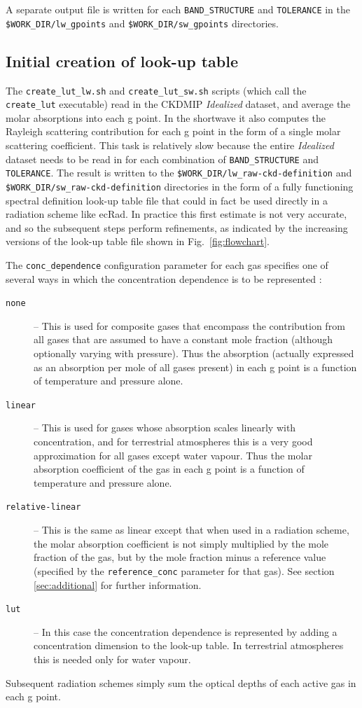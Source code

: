 \documentclass[a4,oneside]{article}
\def\codesize{\small}
\def\codesize{\small}
\def\code#1{{\codesize\texttt{#1}}}
\begin{document}
A separate output file is written for each \code{BAND\_STRUCTURE} and
\code{TOLERANCE} in the \code{\$WORK\_DIR/lw\_gpoints} and
\code{\$WORK\_DIR/sw\_gpoints} directories.

\subsection{Initial creation of look-up table}
\label{sec:create_lut}
The \code{create\_lut\_lw.sh} and \code{create\_lut\_sw.sh} scripts
(which call the \code{create\_lut} executable) read in the CKDMIP
\emph{Idealized} dataset, and average the molar absorptions into each
g point. In the shortwave it also computes the Rayleigh scattering
contribution for each g point in the form of a single molar scattering
coefficient. This task is relatively slow because the entire
\emph{Idealized} dataset needs to be read in for each combination of
\code{BAND\_STRUCTURE} and \code{TOLERANCE}. The result is written to
the \code{\$WORK\_DIR/lw\_raw-ckd-definition} and
\code{\$WORK\_DIR/sw\_raw-ckd-definition} directories in the form of a
fully functioning spectral definition look-up table file that could in
fact be used directly in a radiation scheme like ecRad. In practice
this first estimate is not very accurate, and so the subsequent steps
perform refinements, as indicated by the increasing versions of the
look-up table file shown in Fig.\ \ref{fig:flowchart}.

The \code{conc\_dependence} configuration parameter for each gas
specifies one of several ways in which the concentration dependence is
to be represented \cite[see][for the mathematical
  definition]{Hogan&2022}:
\begin{description}
\item[\code{none}] -- This is used for composite gases that encompass
  the contribution from all gases that are assumed to have a constant
  mole fraction (although optionally varying with pressure). Thus the
  absorption (actually expressed as an absorption per mole of all
  gases present) in each g point is a function of temperature and
  pressure alone.
\item[\code{linear}] -- This is used for gases whose absorption scales
  linearly with concentration, and for terrestrial atmospheres this is
  a very good approximation for all gases except water vapour. Thus
  the molar absorption coefficient of the gas in each g point is a
  function of temperature and pressure alone.
\item[\code{relative-linear}] -- This is the same as linear except
  that when used in a radiation scheme, the molar absorption
  coefficient is not simply multiplied by the mole fraction of the
  gas, but by the mole fraction minus a reference value (specified by
  the \code{reference\_conc} parameter for that gas). See section
  \ref{sec:additional} for further information.
\item[\code{lut}] -- In this case the concentration dependence is
  represented by adding a concentration dimension to the look-up
  table. In terrestrial atmospheres this is needed only for water
  vapour.
\end{description}
Subsequent radiation schemes simply sum the optical depths of each
active gas in each g point.
\end{document}
